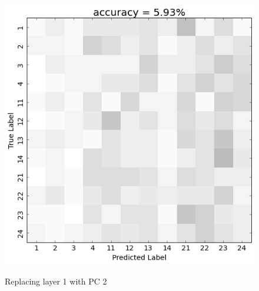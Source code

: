 \begin{figure}[h] 
  \begin{center}
    \includegraphics[scale=0.5]{Figures/PC2_confusion}
   \\\vspace{-0.8em}
    \caption{Replacing layer 1 with PC 2}
    \label{fig:PC2_confusion}
  \end{center}
  \vspace{-1em}
\end{figure}

